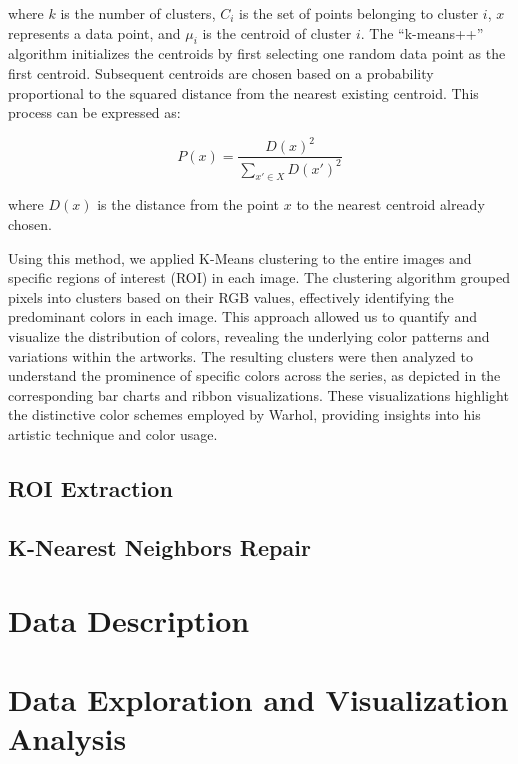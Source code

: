 \documentclass{article}
\begin{document}
where \(k\) is the number of clusters, \(C_i\) is the set of points
belonging to cluster \(i\), \(x\) represents a data point, and \(\mu_i\)
is the centroid of cluster \(i\). The ``k-means++'' algorithm
initializes the centroids by first selecting one random data point as
the first centroid. Subsequent centroids are chosen based on a
probability proportional to the squared distance from the nearest
existing centroid. This process can be expressed as:

\begin{equation}
  P(x) = \frac{D(x)^2}{\sum_{x' \in X} D(x')^2}
\end{equation}

where \(D(x)\) is the distance from the point \(x\) to the nearest
centroid already chosen.

Using this method, we applied K-Means clustering to the entire images
and specific regions of interest (ROI) in each image. The clustering
algorithm grouped pixels into clusters based on their RGB values,
effectively identifying the predominant colors in each image. This
approach allowed us to quantify and visualize the distribution of
colors, revealing the underlying color patterns and variations within
the artworks. The resulting clusters were then analyzed to understand
the prominence of specific colors across the series, as depicted in the
corresponding bar charts and ribbon visualizations. These visualizations
highlight the distinctive color schemes employed by Warhol, providing
insights into his artistic technique and color usage.

\hypertarget{roi-extraction}{%
\subsection{ROI Extraction}\label{roi-extraction}}

\hypertarget{k-nearest-neighbors-repair}{%
\subsection{K-Nearest Neighbors
Repair}\label{k-nearest-neighbors-repair}}

\hypertarget{data-description}{%
\section{Data Description}\label{data-description}}

\hypertarget{data-exploration-and-visualization-analysis}{%
\section{Data Exploration and Visualization
Analysis}\label{data-exploration-and-visualization-analysis}}
\end{document}
